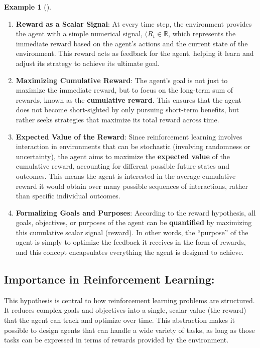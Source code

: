 \documentclass[
  letterpaper,
]{krantz}
\theoremstyle{plain}
\theoremstyle{definition}
\newtheorem{example}{Example}[chapter]
\theoremstyle{definition}
\theoremstyle{remark}
\begin{document}
\begin{example}[]
\begin{enumerate}
\def\labelenumi{\arabic{enumi}.}
\item
  \textbf{Reward as a Scalar Signal}: At every time step, the
  environment provides the agent with a simple numerical signal,
  \((R_t \in \mathbb{R}\), which represents the immediate reward based
  on the agent's actions and the current state of the environment. This
  reward acts as feedback for the agent, helping it learn and adjust its
  strategy to achieve its ultimate goal.
\item
  \textbf{Maximizing Cumulative Reward}: The agent's goal is not just to
  maximize the immediate reward, but to focus on the long-term sum of
  rewards, known as the \textbf{cumulative reward}. This ensures that
  the agent does not become short-sighted by only pursuing short-term
  benefits, but rather seeks strategies that maximize its total reward
  across time.
\item
  \textbf{Expected Value of the Reward}: Since reinforcement learning
  involves interaction in environments that can be stochastic (involving
  randomness or uncertainty), the agent aims to maximize the
  \textbf{expected value} of the cumulative reward, accounting for
  different possible future states and outcomes. This means the agent is
  interested in the average cumulative reward it would obtain over many
  possible sequences of interactions, rather than specific individual
  outcomes.
\item
  \textbf{Formalizing Goals and Purposes}: According to the reward
  hypothesis, all goals, objectives, or purposes of the agent can be
  \textbf{quantified} by maximizing this cumulative scalar signal
  (reward). In other words, the ``purpose'' of the agent is simply to
  optimize the feedback it receives in the form of rewards, and this
  concept encapsulates everything the agent is designed to achieve.
\end{enumerate}

\subsection{Importance in Reinforcement
Learning:}\label{importance-in-reinforcement-learning}

This hypothesis is central to how reinforcement learning problems are
structured. It reduces complex goals and objectives into a single,
scalar value (the reward) that the agent can track and optimize over
time. This abstraction makes it possible to design agents that can
handle a wide variety of tasks, as long as those tasks can be expressed
in terms of rewards provided by the environment.


\end{example}
\end{document}
